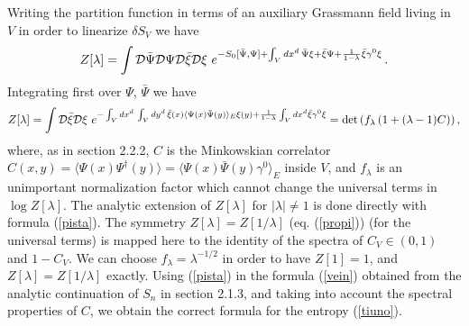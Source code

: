 \documentclass[a4paper]{article}
\begin{document}
 
Writing the partition function in terms of an auxiliary Grassmann field living in $V$ in order to linearize $\delta S_V$ we have
\begin{equation}
 Z[\lambda]=\int {\cal D}\bar{\Psi}{\cal D}\Psi{\cal D}\bar{\xi} {\cal D} \xi\,\, e^{-S_0[\bar{\Psi},\Psi]+\int_V dx^d \, \bar{\Psi} \xi + \bar \xi  \Psi+ \frac{1}{1-\lambda}\bar{\xi} \gamma^0\xi}\,. \label{niu}
\end{equation}
Integrating first over $\Psi$, $\bar{\Psi}$ we have 
\begin{equation}
 Z[\lambda]=\int {\cal D}\bar{\xi} {\cal D} \xi\,\, e^{-\int_V dx^d \,\int_V dy^d \,\bar{\xi}(x) \langle \Psi(x) \bar{\Psi}(y)\rangle_E \xi(y) +  \frac{1}{1-\lambda}\int_V dx^d \bar{\xi} \gamma^0\xi}=\det\left(f_\lambda \left(1+(\lambda-1) C\right)\right), \label{pista}
\end{equation}
where, as in section 2.2.2, $C$ is the Minkowskian correlator $C(x,y)=\langle\Psi(x)\Psi^\dagger(y)\rangle=\langle\Psi(x)\bar{\Psi}(y)\gamma^0\rangle_E$ inside $V$, and $f_\lambda$ is an unimportant normalization factor which cannot change the universal terms in $\log Z[\lambda]$. The analytic extension of $Z[\lambda]$ for $|\lambda|\neq 1$ is done directly with formula (\ref{pista}). The symmetry $Z[\lambda]=Z[1/\lambda]$ (eq. (\ref{propi})) (for the universal terms) is mapped here  to the identity of the spectra of $C_V\in (0,1)$ and $1-C_V$.
We can choose $f_\lambda=\lambda^{-1/2}$ in order to have $Z[1]=1$, and $Z[\lambda]=Z[1/\lambda]$ exactly.  Using (\ref{pista}) in the formula (\ref{vein}) obtained from the analytic continuation of $S_n$ in section 2.1.3, and taking into account the spectral properties of $C$, we obtain the correct formula for the entropy (\ref{tiuno}).
\end{document}
